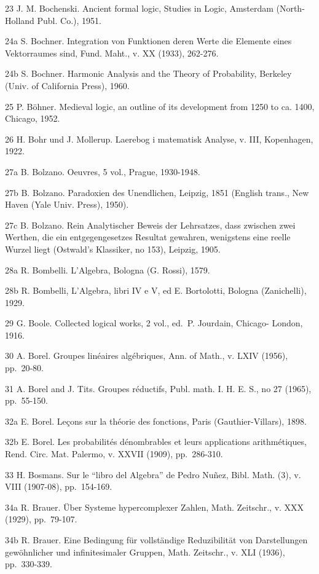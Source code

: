 23 J. M. Bochenski. Ancient formal logic, Studies in Logic, Amsterdam (North-Holland Publ. Co.), 1951.

24a S. Bochner. Integration von Funktionen deren Werte die Elemente eines Vektorraumes sind, Fund. Maht., v. XX (1933), 262-276.

24b S. Bochner. Harmonic Analysis and the Theory of Probability, Berkeley (Univ. of California Press), 1960.

25 P. Böhner. Medieval logic, an outline of its development from 1250 to ca. 1400, Chicago, 1952.

26 H. Bohr und J. Mollerup. Laerebog i matematisk Analyse, v. III, Kopenhagen, 1922.

27a B. Bolzano. Oeuvres, 5 vol., Prague, 1930-1948.

27b B. Bolzano. Paradoxien des Unendlichen, Leipzig, 1851 (English trans., New Haven (Yale Univ. Press), 1950).

27c B. Bolzano. Rein Analytischer Beweis der Lehrsatzes, dass zwischen zwei Werthen, die ein entgegengesetzes Resultat gewahren, wenigstens eine reelle Wurzel liegt (Ostwald's Klassiker, no 153), Leipzig, 1905.

28a R. Bombelli. L'Algebra, Bologna (G. Rossi), 1579.

28b R. Bombelli, L'Algebra, libri IV e V, ed E. Bortolotti, Bologna (Zanichelli), 1929.

29 G. Boole. Collected logical works, 2 vol., ed.~P. Jourdain, Chicago- London, 1916.

30 A. Borel. Groupes linéaires algébriques, Ann. of Math., v. LXIV (1956), pp.~20-80.

31 A. Borel and J. Tits. Groupes réductifs, Publ. math. I. H. E. S., no 27 (1965), pp.~55-150.

32a E. Borel. Leçons sur la théorie des fonctions, Paris (Gauthier-Villars), 1898.

32b E. Borel. Les probabilités dénombrables et leurs applications arithmétiques, Rend. Circ. Mat. Palermo, v. XXVII (1909), pp.~286-310.

33 H. Bosmans. Sur le ``libro del Algebra'' de Pedro Nuñez, Bibl. Math. (3), v. VIII (1907-08), pp.~154-169.

34a R. Brauer. Über Systeme hypercomplexer Zahlen, Math. Zeitschr., v. XXX (1929), pp.~79-107.

34b R. Brauer. Eine Bedingung für vollständige Reduzibilität von Darstellungen gewöhnlicher und infinitesimaler Gruppen, Math. Zeitschr., v. XLI (1936), pp.~330-339.

